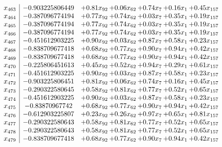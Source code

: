 \documentclass[8pt]{article}
\begin{document}
\[\begin{array}{c| c c@{\hskip 2pt} c@{\hskip 2pt} c@{\hskip 2pt} c@{\hskip 2pt} c@{\hskip 2pt} }
 x_{463}   &  -0.903225806449 & +  0.81 x_{92} & +  0.06 x_{62} & +  0.74 x_{7} & +  0.16 x_{1} & +  0.45 x_{157}\\
 x_{464}   &  -0.387096774194 & +  0.77 x_{92} & +  0.74 x_{62} & +  0.03 x_{7} & +  0.35 x_{1} & +  0.19 x_{157}\\
 x_{465}   &  -0.387096774194 & +  0.77 x_{92} & +  0.74 x_{62} & +  0.03 x_{7} & +  0.35 x_{1} & +  0.19 x_{157}\\
 x_{466}   &  -0.387096774194 & +  0.77 x_{92} & +  0.74 x_{62} & +  0.03 x_{7} & +  0.35 x_{1} & +  0.19 x_{157}\\
 x_{467}   &  -0.451612903225 & +  0.90 x_{92} & +  0.03 x_{62} & +  0.87 x_{7} & +  0.58 x_{1} & +  0.23 x_{157}\\
 x_{468}   &  -0.838709677418 & +  0.68 x_{92} & +  0.77 x_{62} & +  0.90 x_{7} & +  0.94 x_{1} & +  0.42 x_{157}\\
 x_{469}   &  -0.838709677418 & +  0.68 x_{92} & +  0.77 x_{62} & +  0.90 x_{7} & +  0.94 x_{1} & +  0.42 x_{157}\\
 x_{470}   &  -0.225806451613 & +  0.45 x_{92} & +  0.52 x_{62} & +  0.94 x_{7} & +  0.29 x_{1} & +  0.61 x_{157}\\
 x_{471}   &  -0.451612903225 & +  0.90 x_{92} & +  0.03 x_{62} & +  0.87 x_{7} & +  0.58 x_{1} & +  0.23 x_{157}\\
 x_{472}   &  -0.903225806451 & +  0.81 x_{92} & +  0.06 x_{62} & +  0.74 x_{7} & +  0.16 x_{1} & +  0.45 x_{157}\\
 x_{473}   &  -0.290322580645 & +  0.58 x_{92} & +  0.81 x_{62} & +  0.77 x_{7} & +  0.52 x_{1} & +  0.65 x_{157}\\
 x_{474}   &  -0.451612903225 & +  0.90 x_{92} & +  0.03 x_{62} & +  0.87 x_{7} & +  0.58 x_{1} & +  0.23 x_{157}\\
 x_{475}   &  -0.83870967742 & +  0.68 x_{92} & +  0.77 x_{62} & +  0.90 x_{7} & +  0.94 x_{1} & +  0.42 x_{157}\\
 x_{476}   &  -0.612903225807 & +  0.23 x_{92} & +  0.26 x_{62} & +  0.97 x_{7} & +  0.65 x_{1} & +  0.81 x_{157}\\
 x_{477}   &  -0.290322580643 & +  0.58 x_{92} & +  0.81 x_{62} & +  0.77 x_{7} & +  0.52 x_{1} & +  0.65 x_{157}\\
 x_{478}   &  -0.290322580643 & +  0.58 x_{92} & +  0.81 x_{62} & +  0.77 x_{7} & +  0.52 x_{1} & +  0.65 x_{157}\\
 x_{479}   &  -0.838709677418 & +  0.68 x_{92} & +  0.77 x_{62} & +  0.90 x_{7} & +  0.94 x_{1} & +  0.42 x_{157}\\

\end{array}\]
\end{document}

